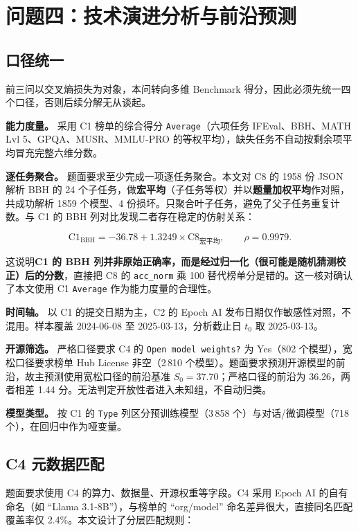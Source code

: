 \section{问题四：技术演进分析与前沿预测}

\subsection{口径统一}

前三问以交叉熵损失为对象，本问转向多维 Benchmark 得分，因此必须先统一四个口径，否则后续分解无从谈起。

\textbf{能力度量。} 采用 C1 榜单的综合得分 \texttt{Average}（六项任务 IFEval、BBH、MATH Lvl 5、GPQA、MUSR、MMLU-PRO 的等权平均），缺失任务不自动按剩余项平均冒充完整六维分数。

\textbf{逐任务聚合。} 题面要求至少完成一项逐任务聚合。本文对 C8 的 1958 份 JSON 解析 BBH 的 24 个子任务，做\textbf{宏平均}（子任务等权）并以\textbf{题量加权平均}作对照，共成功解析 1859 个模型、4 份损坏。只聚合叶子任务，避免了父子任务重复计数。与 C1 的 BBH 列对比发现二者存在稳定的仿射关系：

\begin{equation}
\text{C1}_{\mathrm{BBH}}=-36.78+1.3249\times\text{C8}_{\text{宏平均}},
\qquad \rho=0.9979 .
\end{equation}

这说明\textbf{C1 的 BBH 列并非原始正确率，而是经过归一化（很可能是随机猜测校正）后的分数}，直接把 C8 的 \texttt{acc\_norm} 乘 100 替代榜单分是错的。这一核对确认了本文使用 C1 \texttt{Average} 作为能力度量的合理性。

\textbf{时间轴。} 以 C1 的提交日期为主，C2 的 Epoch AI 发布日期仅作敏感性对照，不混用。样本覆盖 2024-06-08 至 2025-03-13，分析截止日 $t_0$ 取 2025-03-13。

\textbf{开源筛选。} 严格口径要求 C4 的 \texttt{Open model weights?} 为 Yes（802 个模型），宽松口径要求榜单 Hub License 非空（2\,810 个模型）。题面要求预测开源模型的前沿，故主预测使用宽松口径的前沿基准 $S_0=37.70$；严格口径的前沿为 36.26，两者相差 1.44 分。无法判定开放性者进入未知组，不自动归类。

\textbf{模型类型。} 按 C1 的 \texttt{Type} 列区分预训练模型（3\,858 个）与对话/微调模型（718 个），在回归中作为哑变量。

\subsection{C4 元数据匹配}

题面要求使用 C4 的算力、数据量、开源权重等字段。C4 采用 Epoch AI 的自有命名（如 ``Llama 3.1-8B''），与榜单的 ``org/model'' 命名差异很大，直接同名匹配覆盖率仅 2.4\%。本文设计了分层匹配规则：

